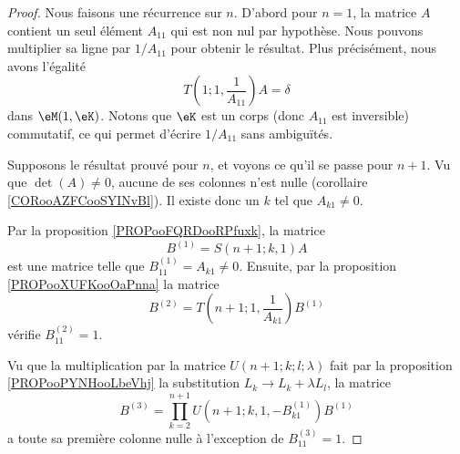 \begin{proof}
    Nous faisons une récurrence sur \( n\). D'abord pour \( n=1\), la matrice \( A\) contient un seul élément \( A_{11}\) qui est non nul par hypothèse. Nous pouvons multiplier sa ligne par \( 1/A_{11}\) pour obtenir le résultat. Plus précisément, nous avons l'égalité
    \begin{equation}
        T(1;1,\frac{1}{ A_{11} })A=\delta
    \end{equation}
    dans \( \eM(1, \eK)\). Notons que \( \eK\) est un corps (donc \( A_{11}\) est inversible) commutatif, ce qui permet d'écrire \( 1/A_{11}\) sans ambiguïtés.

    Supposons le résultat prouvé pour \( n\), et voyons ce qu'il se passe pour \( n+1\). Vu que \( \det(A)\neq 0\), aucune de ses colonnes n'est nulle (corollaire \ref{CORooAZFCooSYINvBl}). Il existe donc un \( k\) tel que \( A_{k1}\neq 0\).

    Par la proposition \ref{PROPooFQRDooRPfuxk}, la matrice
    \begin{equation}
        B^{(1)}=S(n+1;k,1)A
    \end{equation}
    est une matrice telle que \( B^{(1)}_{11}=A_{k1}\neq 0\). Ensuite, par la proposition \ref{PROPooXUFKooOaPnna} la matrice
    \begin{equation}
        B^{(2)}=T(n+1;1,\frac{1}{ A_{k1} })B^{(1)}
    \end{equation}
    vérifie \( B^{(2)}_{11}=1\). 

    Vu que la multiplication par la matrice \( U(n+1;k;l;\lambda)\) fait par la proposition \ref{PROPooPYNHooLbeVhj} la substitution \( L_k\to L_{k}+\lambda L_l\), la matrice
    \begin{equation}
        B^{(3)}=\prod_{k=2}^{n+1}U(n+1;k,1,-B^{(1)}_{k1})B^{(1)}
    \end{equation}
    a toute sa première colonne nulle à l'exception de \( B^{(3)}_{11}=1\).


\end{proof}
